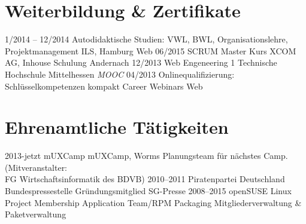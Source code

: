 \documentclass[a4paper]{friggeri-cv} %
\begin{document}

\section{Weiterbildung \& Zertifikate}

\begin{entrylist}
\entry
{1/2014 -- 12/2014}
{Autodidaktische Studien: VWL, BWL, Organisationslehre, Projektmanagement}
{ILS, Hamburg}
{Web}
\entry
{06/2015}
{SCRUM Master Kurs}
{XCOM AG, Inhouse Schulung}
{Andernach}
\entry
{12/2013}
{Web Engeneering 1}
{Technische Hochschule Mittelhessen}
{\emph{MOOC}}
\entry
{04/2013}
{Onlinequalifizierung: Schlüsselkompetenzen kompakt}
{Career Webinars}
{Web}
\end{entrylist}

\section{Ehrenamtliche Tätigkeiten}
\begin{entrylist}
\entry
{2013-jetzt}
{mUXCamp}
{mUXCamp, Worms}
{Planungsteam für nächstes Camp. (Mitveranstalter: \\FG Wirtschaftsinformatik des BDVB)}
\entry
{2010--2011}
{Piratenpartei Deutschland}
{Bundespressestelle}
{Gründungsmitglied SG-Presse}
\entry
{2008--2015}
{openSUSE Linux Project}
{Membership Application Team/RPM Packaging}
{Mitgliederverwaltung \& Paketverwaltung}
\end{entrylist}

\newpage
\end{document}
